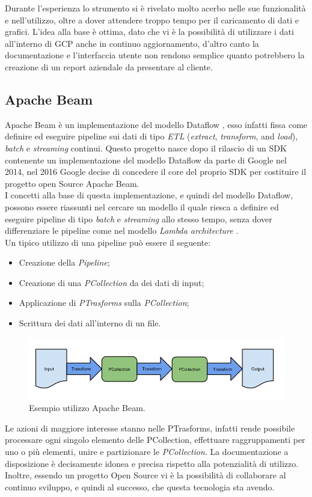 Durante l'esperienza lo strumento si è rivelato molto acerbo nelle sue funzionalità e nell'utilizzo, oltre a dover attendere troppo tempo per il caricamento di dati e grafici. L'idea alla base è ottima, dato che vi è la possibilità di utilizzare i dati all'interno di GCP anche in continuo aggiornamento, d'altro canto la documentazione e l'interfaccia utente non rendono semplice quanto potrebbero la creazione di un report aziendale da presentare al cliente.	
\subsection{Apache Beam}
Apache Beam è un implementazione del modello Dataflow \cite{modelloDataflow}, esso infatti fissa come definire ed eseguire pipeline sui dati di tipo \emph{ETL} (\emph{extract}, \emph{transform}, and \emph{load}), \emph{batch} e \emph{streaming} continui. Questo progetto nasce dopo il rilascio di un \gls{SDK} contenente un implementazione del modello Dataflow da parte di Google nel 2014, nel 2016 Google decise di concedere il core del proprio SDK per costituire il progetto \Gls{open Source} Apache Beam.
\\ I concetti alla base di questa implementazione, e quindi del modello Dataflow, possono essere riassunti nel cercare un modello il quale riesca a definire ed eseguire pipeline di tipo \emph{batch} e \emph{streaming} allo stesso tempo, senza dover differenziare le pipeline come nel modello \emph{Lambda architecture} \cite{Lambdaarchitecture}.
\\ Un tipico utilizzo di una pipeline può essere il seguente:
\begin{itemize}
	\item Creazione della \emph{Pipeline};
	\item Creazione di una \emph{PCollection} da dei dati di input;
	\item Applicazione di \emph{PTrasforms} sulla \emph{PCollection};
	\item Scrittura dei dati all'interno di un file.
\end{itemize}
\begin{figure}[h!]
	\centering
	\includegraphics[scale=0.5]{figures/design-your-pipeline-linear}
	\caption[Esempio utilizzo Apache Beam. ]{Esempio utilizzo Apache Beam.
		\label{fig:beam}}
\end{figure}	
Le azioni di maggiore interesse stanno nelle PTrasforms, infatti rende possibile processare ogni singolo elemento delle PCollection, effettuare raggruppamenti per uno o più elementi, unire  e partizionare le \emph{PCollection}.
La documentazione a disposizione è decisamente idonea e precisa rispetto alla potenzialità di utilizzo. Inoltre, essendo un progetto Open Source vi è la possibilità di collaborare al continuo sviluppo, e quindi al successo, che questa tecnologia sta avendo.

